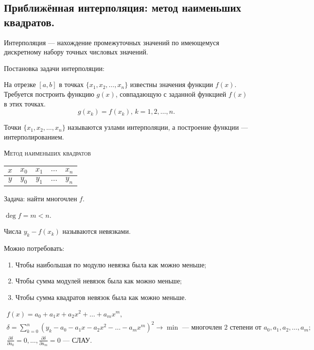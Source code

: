 \subsection{Приближённая интерполяция: метод наименьших квадратов.}

Интерполяция --- нахождение промежуточных значений по имеющемуся дискретному набору точных числовых значений. 

Постановка задачи интерполяции:

На отрезке $[a, b]$ в точках $\{x_1, x_2, \dotsc, x_n\}$ известны значения функции $f(x)$. Требуется построить функцию $g(x)$, совпадающую с заданной функцией $f(x)$ в этих точках.
\begin{equation*}
	g(x_k) = f(x_k), \, k = 1, 2, \dotsc, n.
\end{equation*}

Точки $\{x_1, x_2, \dotsc, x_n\}$ называются узлами интерполяции, а построение функции --- интерполированием. 

\textsc{Метод наименьших квадратов}

\begin{table}[H]
	\centering
	\begin{tabular}{|c|c|c|c|c|}
		\hline
		{$x$} & {$x_0$} & {$x_1$} & {$\dotsc$} & {$x_n$} \\ \hline 
		{$y$} & {$y_0$} & {$y_1$} & {$\dotsc$} & {$y_n$} \\ \hline 
	\end{tabular}
\end{table}

Задача: найти многочлен $f$.

$\deg{f} = m < n$.

Числа $y_k - f(x_k)$ называются невязками. 

Можно потребовать:
\begin{enumerate}
	\item Чтобы наибольшая по модулю невязка была как можно меньше;
	
	\item Чтобы сумма модулей невязок была как можно меньше;
	
	\item Чтобы сумма квадратов невязок была как можно меньше.
\end{enumerate}
\begin{gather*}
	f(x) = a_0 + a_1 x + a_2 x^2 + \dotsc + a_m x^m, \\
	\delta = \sum\limits_{k = 0}^{n}(y_{k} - a_0 - a_1 x - a_2 x^2 - \dotsc - a_m x^m)^2 \to \min \text{ --- многочлен 2 степени от } a_0, a_1, a_2, \dotsc, a_m; \\
	\frac{\partial \delta}{\partial a_0} = 0, \dotsc, \frac{\partial \delta}{\partial a_m} = 0 \text{ --- СЛАУ}.
\end{gather*}

